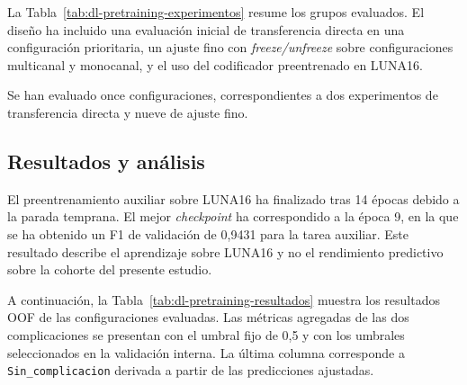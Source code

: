 La Tabla~\ref{tab:dl-pretraining-experimentos} resume los grupos evaluados. El diseño ha incluido una evaluación inicial de transferencia directa en una configuración prioritaria, un ajuste fino con \textit{freeze/unfreeze} sobre configuraciones multicanal y monocanal, y el uso del codificador preentrenado en LUNA16.

\begin{table}[!htbp]
\centering
\caption{Resumen de los experimentos de transferencia de aprendizaje evaluados.}
\label{tab:dl-pretraining-experimentos}
\end{table}

Se han evaluado once configuraciones, correspondientes a dos experimentos de transferencia directa y nueve de ajuste fino.

\subsection{Resultados y análisis}

El preentrenamiento auxiliar sobre LUNA16 ha finalizado tras 14 épocas debido a la parada temprana. El mejor \textit{checkpoint} ha correspondido a la época 9, en la que se ha obtenido un F1 de validación de 0,9431 para la tarea auxiliar. Este resultado describe el aprendizaje sobre LUNA16 y no el rendimiento predictivo sobre la cohorte del presente estudio.

A continuación, la Tabla~\ref{tab:dl-pretraining-resultados} muestra los resultados OOF de las configuraciones evaluadas. Las métricas agregadas de las dos complicaciones se presentan con el umbral fijo de 0,5 y con los umbrales seleccionados en la validación interna. La última columna corresponde a \texttt{Sin\_complicacion} derivada a partir de las predicciones ajustadas.


